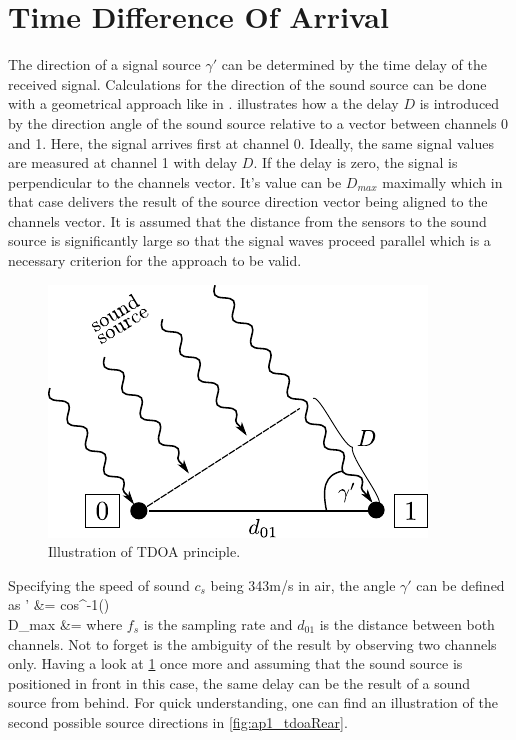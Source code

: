 \section{Time Difference Of Arrival}
\label{sec:02_tdoa}

The direction of a signal source $\gamma'$ can be determined by the time
delay of the received signal.
Calculations for the direction of the sound source can be done with a
geometrical approach like in \cite{Valin_Michaud}.
 illustrates how a the delay $D$ is introduced by the direction angle
of the sound source relative to a vector between channels 0 and 1.
Here, the signal arrives first at channel 0. Ideally, the same signal values
are measured at channel 1 with delay $D$.
If the delay is zero, the signal is perpendicular to the channels vector.
It's value can be $D_{max}$ maximally which in that case delivers the
result of the source direction vector being aligned to the channels vector.
It is assumed that the distance from the sensors to the sound source is
significantly large so that the signal waves proceed parallel which is a necessary
criterion for the approach to be valid.
\begin{figure}[ht]
	\centering
		\includegraphics[width=0.4\columnwidth]{figures/tdoa_waves}
	\caption{Illustration of TDOA principle.}
    \label{fig:02_tdoa}
\end{figure}

Specifying the speed of sound $c_s$ being 343\si{m/s} in air, the angle
$\gamma'$ can be defined as
\bsub \bal
    \gamma' &= cos^{-1}()
    \label{eq:02_tdoaAngle}\\
    D_{max} &= 
\eal \esub
where $f_s$ is the sampling rate and $d_{01}$ is the distance between both channels.
Not to forget is the ambiguity of the result by observing two channels only.
Having a look at \cref{fig:02_tdoa} once more and assuming that the sound source
is positioned in front in this case, the same delay can be the result of a
sound source from behind.
For quick understanding, one can find an illustration of the second possible
source directions in \cref{fig:ap1_tdoaRear}.

